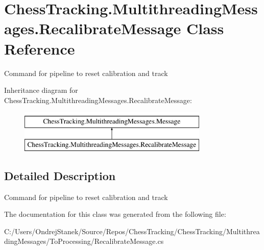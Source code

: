 \hypertarget{class_chess_tracking_1_1_multithreading_messages_1_1_recalibrate_message}{}\section{Chess\+Tracking.\+Multithreading\+Messages.\+Recalibrate\+Message Class Reference}
\label{class_chess_tracking_1_1_multithreading_messages_1_1_recalibrate_message}


Command for pipeline to reset calibration and track  


Inheritance diagram for Chess\+Tracking.\+Multithreading\+Messages.\+Recalibrate\+Message\+:\begin{figure}[H]
\begin{center}
\leavevmode
\includegraphics[height=2.000000cm]{class_chess_tracking_1_1_multithreading_messages_1_1_recalibrate_message}
\end{center}
\end{figure}


\subsection{Detailed Description}
Command for pipeline to reset calibration and track 



The documentation for this class was generated from the following file\+:\begin{DoxyCompactItemize}
\item 
C\+:/\+Users/\+Ondrej\+Stanek/\+Source/\+Repos/\+Chess\+Tracking/\+Chess\+Tracking/\+Multithreading\+Messages/\+To\+Processing/Recalibrate\+Message.\+cs\end{DoxyCompactItemize}
